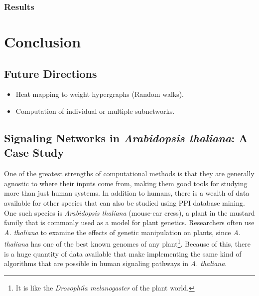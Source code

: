 \documentclass[12pt,twoside]{reedthesis}
\theoremstyle{definition}
\begin{document}
   \subsection{Results}

\chapter*{Conclusion}
	\setcounter{chapter}{5}
	\setcounter{section}{0}

  \section{Future Directions}
   \begin{itemize}
     \item{Heat mapping to weight hypergraphs (Random walks).}
     \item{Computation of individual or multiple subnetworks.}
   \end{itemize}

   \section{Signaling Networks in \emph{Arabidopsis thaliana}: A Case Study}

   One of the greatest strengths of computational methods is that they are generally agnostic to where their inputs come from, making them good tools for studying more than just human systems. In addition to humans, there is a wealth of data available for other species that can also be studied using PPI database mining. One such species is \textit{Arabidopsis thaliana} (mouse-ear cress), a plant in the mustard family that is commonly used as a model for plant genetics. Researchers often use \textit{A. thaliana} to examine the effects of genetic manipulation on plants, since \textit{A. thaliana} has one of the best known genomes of any plant\footnote{It is like the \textit{Drosophila melanogaster} of the plant world.}. Because of this, there is a huge quantity of data available that make implementing the same kind of algorithms that are possible in human signaling pathways in \textit{A. thaliana}.
\end{document}
